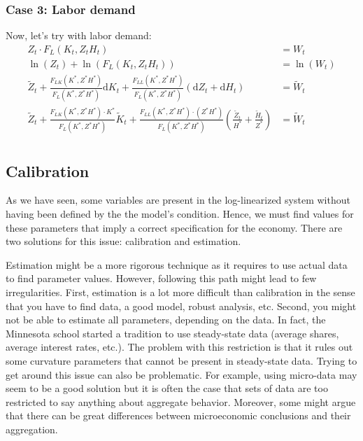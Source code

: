 \documentclass[12pt]{report}
\def\D{\mathrm{d}}
\def\D{\mathrm{d}}
\begin{document}
\subsubsection{Case 3: Labor demand}

Now, let's try with labor demand:\begin{align*}
Z_t \cdot F_L(K_t, Z_tH_t) & = W_t \\
\ln(Z_t) + \ln(F_L(K_t, Z_tH_t)) & = \ln(W_t) \\
\tilde Z_t + \frac{F_{LK}(K^*, Z^* H^*)}{F_L(K^*, Z^*H^*)}\D K_t + \frac{F_{LL}(K^*, Z^* H^*)}{F_L(K^*, Z^*H^*)}(\D Z_t + \D H_t) & = \tilde W_t \\
\tilde Z_t + \frac{F_{LK}(K^*, Z^* H^*)\cdot K^*}{F_L(K^*, Z^*H^*)}\tilde K_t + \frac{F_{LL}(K^*, Z^* H^*)\cdot(Z^*H^*)}{F_L(K^*, Z^*H^*)}(\frac{\tilde Z_t}{H^*} + \frac{\tilde H_t}{Z^*}) & = \tilde W_t \\
\end{align*}

\subsection{Calibration}

As we have seen, some variables are present in the log-linearized system without having been defined by the the model's condition. Hence, we must find values for these parameters that imply a correct specification for the economy. There are two solutions for this issue: calibration and estimation.

Estimation might be a more rigorous technique as it requires to use actual data to find parameter values. However, following this path might lead to few irregularities. First, estimation is a lot more difficult than calibration in the sense that you have to find data, a good model, robust analysis, etc. Second, you might not be able to estimate all parameters, depending on the data. In fact, the Minnesota school started a tradition to use steady-state data (average shares, average interest rates, etc.). The problem with this restriction is that it rules out some curvature parameters that cannot be present in steady-state data. Trying to get around this issue can also be problematic. For example, using micro-data may seem to be a good solution but it is often the case that sets of data are too restricted to say anything about aggregate behavior. Moreover, some might argue that there can be great differences between microeconomic conclusions and their aggregation.
\end{document}
